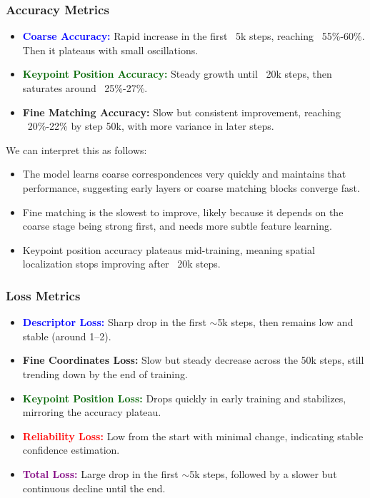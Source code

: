 \subsubsection{Accuracy Metrics}
\begin{itemize}
    \item \textcolor{blue}{\textbf{Coarse Accuracy: }}Rapid increase in the first ~5k steps, reaching ~55\%-60\%. Then it plateaus with small oscillations.
    \item \textcolor{darkgreen}{\textbf{Keypoint Position Accuracy: }}Steady growth until ~20k steps, then saturates around ~25\%-27\%.
    \item \textcolor{myorange}{\textbf{Fine Matching Accuracy: }}Slow but consistent improvement, reaching ~20\%-22\% by step 50k, with more variance in later steps.
\end{itemize}
We can interpret this as follows:
\begin{itemize}
    \item The model learns coarse correspondences very quickly and maintains that
          performance, suggesting early layers or coarse matching blocks converge fast.
    \item Fine matching is the slowest to improve, likely because it depends on the
          coarse stage being strong first, and needs more subtle feature learning.
    \item Keypoint position accuracy plateaus mid-training, meaning spatial localization
          stops improving after ~20k steps.
\end{itemize}
\subsubsection{Loss Metrics}
\begin{itemize}
    \item \textcolor{blue}{\textbf{Descriptor Loss: }}Sharp drop in the first $\sim$5k steps, then remains low and stable (around 1--2).
    \item \textcolor{myorange}{\textbf{Fine Coordinates Loss: }}Slow but steady decrease across the 50k steps, still trending down by the end of training.
    \item \textcolor{darkgreen}{\textbf{Keypoint Position Loss: }}Drops quickly in early training and stabilizes, mirroring the accuracy plateau.
    \item \textcolor{red}{\textbf{Reliability Loss: }}Low from the start with minimal change, indicating stable confidence estimation.
    \item \textcolor{purple}{\textbf{Total Loss: }}Large drop in the first $\sim$5k steps, followed by a slower but continuous decline until the end.
\end{itemize}

